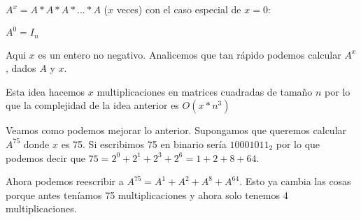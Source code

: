 $A^{x}= A*A*A*...*A$ ($x$ veces) con el caso especial de $x=0$: 

$A^{0}= I_{n}$

Aqui $x$ es un entero no negativo. Analicemos que tan rápido podemos calcular $A^x$, dados $A$ y $x$.

Esta idea hacemos $x$ multiplicaciones en matrices cuadradas de tamaño $n$ por lo que la complejidad de la idea anterior es $O(x*n^3)$ 

Veamos como podemos mejorar lo anterior. Supongamos que queremos calcular $A^{75}$ donde $x$ es 75. Si escribimos 75 en binario sería $10001011_{2}$ por lo que podemos decir que $75 = 2^0 + 2^1 + 2^3 + 2^6 = 1 + 2 +8 + 64$.

Ahora podemos reescribir a $A^{75}=A^{1}+A^{2}+A^{8}+A^{64}$. Esto ya cambia las cosas porque antes teníamos 75 multiplicaciones y ahora solo tenemos 4 multiplicaciones.